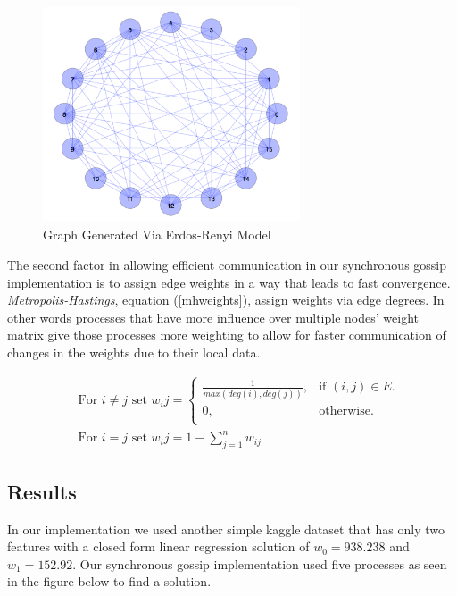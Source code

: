 \documentclass{article}
\theoremstyle{definition}
\begin{document}
{{\begin{figure}[ht]
    \centering
    \includegraphics[width=3.0in]{graph}
    \caption{Graph Generated Via Erdos-Renyi Model}
    \label{graph}
\end{figure}

The second factor in allowing efficient communication in our synchronous gossip implementation is to assign edge weights in a way that leads to fast convergence. \textit{Metropolis-Hastings}, equation (\ref{mhweights}), assign weights via edge degrees. In other words processes that have more influence over multiple nodes' weight matrix give those processes more weighting to allow for faster communication of changes in the weights due to their local data.

\begin{equation}
    \label{mhweights}
    \begin{split}
        & \text{ For } i\neq j \text{ set } w_ij =\begin{cases}
        \frac{1}{max(deg(i),deg(j))}, & \text{if $(i,j) \in E$}.\\
        0, & \text{otherwise}.\\
      \end{cases} \\
      & \text{ For } i = j \text{ set } w_ij = 1 - \sum_{j=1}^{n} w_{ij}
  \end{split}
\end{equation}
\subsection{Results}
In our implementation we used another simple kaggle dataset that has only two features with a closed form linear regression solution of $w_0 = 938.238$ and $w_1 = 152.92$. Our synchronous gossip implementation used five processes as seen in the figure below to find a solution. 

}}
\end{document}

